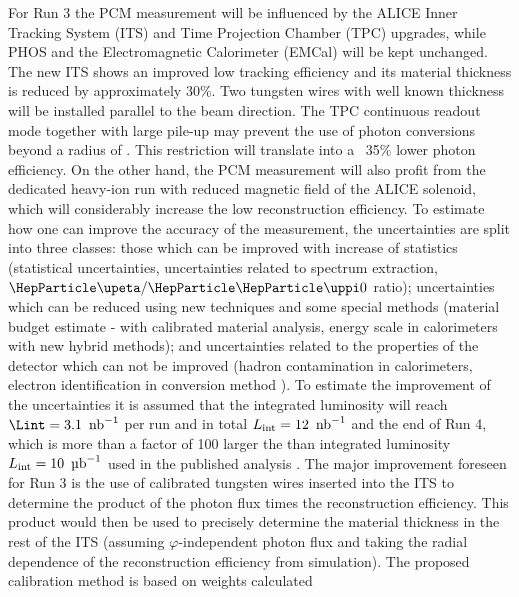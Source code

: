 For Run 3 the PCM measurement will be influenced by the ALICE Inner Tracking System (ITS) and Time Projection Chamber (TPC) upgrades, while PHOS and the Electromagnetic Calorimeter (EMCal) will be kept unchanged. 
The new ITS shows an improved low \pT{} tracking efficiency and its material thickness is reduced by approximately 30\%. Two \unit[1]{\Umm} tungsten wires with well known thickness will be installed parallel to the beam direction. 
The TPC continuous readout mode together with large pile-up may prevent the use of photon conversions beyond a radius of \unit[35]{\Ucm}. This restriction will translate into a ~35\% lower photon efficiency. On the other hand, the PCM measurement will also profit from the dedicated heavy-ion run with reduced magnetic field of the ALICE solenoid, which will considerably increase the low \pT{} reconstruction efficiency.
To estimate how one can improve the accuracy of the measurement, the uncertainties are split into three classes: those which can be improved with increase of statistics (statistical uncertainties, uncertainties related to \PGpz spectrum extraction, $\PGh/\PGpz$ ratio); uncertainties which can be reduced using new techniques and some special methods (material budget estimate - with calibrated material analysis, energy scale in calorimeters with new hybrid \PGpz methods); and uncertainties related to the properties of the detector which can not be improved (hadron contamination in calorimeters, electron identification in conversion method \etc). 
To estimate the improvement of the uncertainties it is assumed that the integrated luminosity will reach $\Lint=\unit[3.1]{\Unb^{-1}}$ per \PbPb run and in total $L_{\rm int}=\unit[12]{\Unb^{-1}}$ and the end of Run 4, which is more than a factor of 100 larger the than integrated luminosity $L_{\rm int}=\unit[10]{\Uub^{-1}}$ used in the published analysis \cite{Adam:2015lda}. %
The major improvement foreseen for Run 3 is the use of calibrated tungsten wires
inserted into the ITS to determine the product of the photon flux times the \PGg reconstruction efficiency. This product would then be used to precisely determine the material thickness in the rest of the ITS (assuming $\varphi$-independent photon flux and taking the radial dependence of the reconstruction efficiency from simulation).
The proposed calibration method is based on weights calculated 
